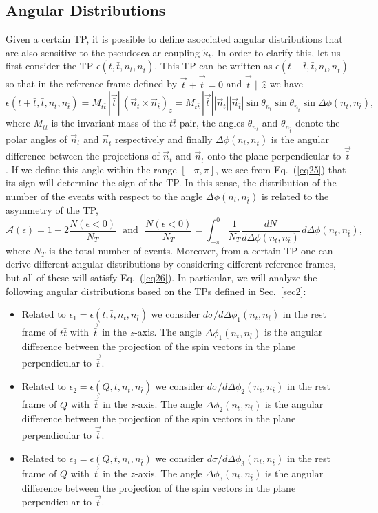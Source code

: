 \documentclass[aps,preprint,tightenlines,floatfix,superscriptaddress,nofootinbib,showpacs]{revtex4-1}
\def\beq{\begin{equation}}
\def\eeq{\end{equation}}
\def\tbar{\bar{t}}
\def\kpt{\tilde{\kappa}_t}
\def\TPa{\epsilon(t,\tbar,n_t,n_{\tbar})}
\def\TPb{\epsilon(Q,\tbar,n_t,n_{\tbar})}
\def\TPc{\epsilon(Q,t,n_t,n_{\tbar})}
\begin{document}
\subsection{Angular Distributions}
\label{sec3.2}
Given a certain TP, it is possible to define asocciated angular
distributions that are also sensitive to the pseudoscalar coupling
$\kpt$. In order to clarify this, let us first consider the TP
$\epsilon(t,\tbar,n_t,n_{\tbar})$. This TP can be written as
$\epsilon(t+\tbar,\tbar,n_t,n_{\tbar})$ so that in the reference frame
defined by $\vec{t}+\vec{\tbar} =0$ and $\vec{\tbar}\parallel \hat{z}$
we have
%
\beq
\label{eq25}
\epsilon(t+\tbar,\tbar,n_t,n_{\tbar})=M_{t\tbar}\,|\vec{\tbar}|\,(\vec{n}_t\times \vec{n}_{\tbar})_z=M_{t\tbar}\,|\vec{\tbar}||\vec{n}_t||\vec{n}_{\tbar}|\sin\theta_{n_t}\sin\theta_{n_{\tbar}}\sin \Delta \phi(n_t,n_{\tbar}),
\eeq
%
where $M_{t\tbar}$ is the invariant mass of the $t\tbar$ pair, the
angles $\theta_{n_t}$ and $\theta_{n_{\tbar}}$ denote the polar angles
of $\vec{n}_t$ and $\vec{n}_{\tbar}$ respectively and finally
$\Delta\phi(n_t,n_{\tbar})$ is the angular difference between the
projections of $\vec{n}_t$ and $\vec{n}_{\tbar}$ onto the plane
perpendicular to $\vec{\bar{t}}$. If we define this angle within the
range $[-\pi,\pi]$, we see from Eq.~(\ref{eq25}) that its sign will
determine the sign of the TP. In this sense, the distribution of the
number of the events with respect to the angle
$\Delta\phi(n_t,n_{\tbar})$ is related to the asymmetry of the TP,
%
\beq
\label{eq26}
\mathcal{A}(\epsilon)=1-2\frac{N(\epsilon < 0)}{N_T}\,\,\mbox{ and }\,\,\frac{N(\epsilon < 0)}{N_T}=\int^0_{-\pi}\frac{1}{N_T}\frac{dN}{d\Delta\phi(n_t,n_{\tbar})}\,d\Delta\phi(n_t,n_{\tbar}),
\eeq  
%
where $N_T$ is the total number of events. Moreover, from a certain TP
one can derive different angular distributions by considering
different reference frames, but all of these will satisfy
Eq.~(\ref{eq26}). In particular, we will analyze the following angular
distributions based on the TPs defined in Sec.~\ref{sec2}:
\begin{itemize}
\item Related to $\epsilon_1 = \TPa$ we consider
  $d\sigma/d\Delta\phi_1(n_t,n_{\tbar})$ in the rest frame of $t\tbar$
  with $\vec{\tbar}$ in the $z$-axis. The angle
  $\Delta\phi_1(n_t,n_{\tbar})$ is the angular difference between the
  projection of the spin vectors in the plane perpendicular to
  $\vec{\tbar}$.
\item Related to $\epsilon_2 = \TPb$ we consider
  $d\sigma/d\Delta\phi_2(n_t,n_{\tbar})$ in the rest frame of $Q$ with
  $\vec{\tbar}$ in the $z$-axis. The angle
  $\Delta\phi_2(n_t,n_{\tbar})$ is the angular difference between the
  projection of the spin vectors in the plane perpendicular to
  $\vec{\tbar}$.
\item Related to $\epsilon_3 = \TPc$ we consider
  $d\sigma/d\Delta\phi_3(n_t,n_{\tbar})$ in the rest frame of $Q$ with
  $\vec{t}$ in the $z$-axis. The angle $\Delta\phi_3(n_t,n_{\tbar})$
  is the angular difference between the projection of the spin vectors
  in the plane perpendicular to $\vec{t}$.
\end{itemize}
\end{document}
